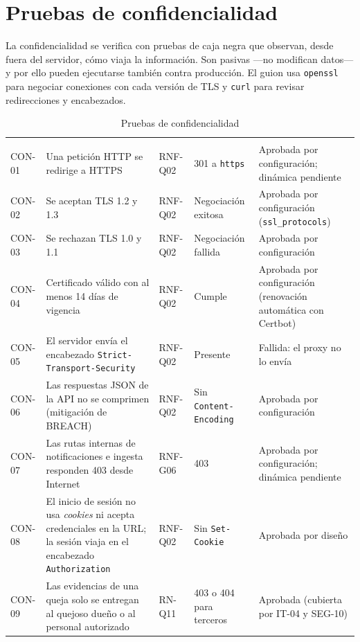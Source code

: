 	\section{Pruebas de confidencialidad}
	\label{sec:pruebas_confidencialidad}
	La confidencialidad se verifica con pruebas de caja negra que observan, desde fuera del servidor, cómo
	viaja la información. Son pasivas ---no modifican datos--- y por ello pueden ejecutarse también contra
	producción. El guion usa \texttt{openssl} para negociar conexiones con cada versión de TLS y
	\texttt{curl} para revisar redirecciones y encabezados.

	\small
	\renewcommand{\arraystretch}{1.2}
	\setlength{\tabcolsep}{4pt}
	\begin{longtable}{|p{1.2cm}|L{5.6cm}|L{2.2cm}|L{2.6cm}|L{2.9cm}|}
		\caption{Pruebas de confidencialidad}
		\label{tab:pruebas_confidencialidad} \\
		\hline
		 &  &  &
		 &  \\
		\hline
		\endfirsthead
		\hline
		 &  &  &
		 &  \\
		\hline
		\endhead
		CON-01 & Una petición HTTP se redirige a HTTPS & RNF-Q02 & 301 a \texttt{https} & Aprobada por
		configuración; dinámica pendiente \\ \hline
		CON-02 & Se aceptan TLS 1.2 y 1.3 & RNF-Q02 & Negociación exitosa & Aprobada por configuración
		(\texttt{ssl\_protocols}) \\ \hline
		CON-03 & Se rechazan TLS 1.0 y 1.1 & RNF-Q02 & Negociación fallida & Aprobada por configuración \\ \hline
		CON-04 & Certificado válido con al menos 14 días de vigencia & RNF-Q02 & Cumple & Aprobada por
		configuración (renovación automática con Certbot) \\ \hline
		CON-05 & El servidor envía el encabezado \texttt{Strict-Transport-Security} & RNF-Q02 & Presente &
		Fallida: el proxy no lo envía \\ \hline
		CON-06 & Las respuestas JSON de la API no se comprimen (mitigación de BREACH) & RNF-Q02 & Sin
		\texttt{Content-Encoding} & Aprobada por configuración \\ \hline
		CON-07 & Las rutas internas de notificaciones e ingesta responden 403 desde Internet & RNF-G06 &
		403 & Aprobada por configuración; dinámica pendiente \\ \hline
		CON-08 & El inicio de sesión no usa \textit{cookies} ni acepta credenciales en la URL; la sesión
		viaja en el encabezado \texttt{Authorization} & RNF-Q02 & Sin \texttt{Set-Cookie} & Aprobada por
		diseño \\ \hline
		CON-09 & Las evidencias de una queja solo se entregan al quejoso dueño o al personal autorizado &
		RN-Q11 & 403 o 404 para terceros & Aprobada (cubierta por IT-04 y SEG-10) \\ \hline
	\end{longtable}
	\normalsize

